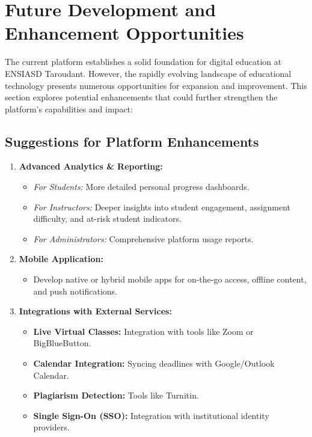 \documentclass[12pt,a4paper]{article}
\begin{document}
\section{Future Development and Enhancement Opportunities}
\label{sec:future-development}

The current platform establishes a solid foundation for digital education at ENSIASD Taroudant. However, the rapidly evolving landscape of educational technology presents numerous opportunities for expansion and improvement. This section explores potential enhancements that could further strengthen the platform's capabilities and impact:
\subsection{Suggestions for Platform Enhancements}
\begin{enumerate}
    \item \textbf{Advanced Analytics \& Reporting:}
    \begin{itemize}
        \item \textit{For Students:} More detailed personal progress dashboards.
        \item \textit{For Instructors:} Deeper insights into student engagement, assignment difficulty, and at-risk student indicators.
        \item \textit{For Administrators:} Comprehensive platform usage reports.
    \end{itemize}
    \item \textbf{Mobile Application:}
    \begin{itemize}
        \item Develop native or hybrid mobile apps for on-the-go access, offline content, and push notifications.
    \end{itemize}
    \item \textbf{Integrations with External Services:}
    \begin{itemize}
        \item \textbf{Live Virtual Classes:} Integration with tools like Zoom or BigBlueButton.
        \item \textbf{Calendar Integration:} Syncing deadlines with Google/Outlook Calendar.
        \item \textbf{Plagiarism Detection:} Tools like Turnitin.
        \item \textbf{Single Sign-On (SSO):} Integration with institutional identity providers.
    \end{itemize}

\end{enumerate}
\end{document}
